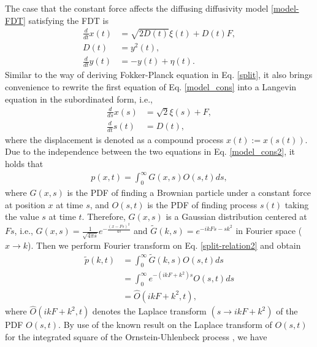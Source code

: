 \documentclass[aps,pre,twocolumn,groupedaddress,longbibliography]{revtex4-2}
\begin{document}
The case that the constant force affects the diffusing diffusivity model \eqref{model-FDT} satisfying the FDT is
\begin{equation}\label{model_cons}
\begin{split}
\frac{d}{d t}x(t)&=\sqrt{2D(t)}\xi(t)+D(t)F,\\
D(t)&=y^2(t),\\
\frac{d}{d t}y(t)&=-y(t)+\eta(t).
\end{split}
\end{equation}
Similar to the way of deriving Fokker-Planck equation in Eq. \eqref{split}, it also brings convenience to rewrite the first equation of Eq. \eqref{model_cons} into a Langevin equation in the subordinated form, i.e.,
\begin{equation}\label{model_cons2}
\begin{split}
\frac{d}{d s}x(s)&=\sqrt{2}\xi(s)+F,\\
\frac{d }{d t}s(t)&=D(t),
\end{split}
\end{equation}
where the displacement is denoted as a compound process $x(t):=x(s(t))$.
Due to the independence between the two equations in Eq. \eqref{model_cons2}, it holds that
\begin{equation}\label{split-relation2}
\begin{split}
p(x,t)=\int_0^\infty G(x,s)O(s,t)ds,
\end{split}
\end{equation}
where $G(x,s)$ is the PDF of finding a Brownian particle under a constant force at position $x$ at time $s$, and $O(s,t)$ is the PDF of finding process $s(t)$ taking the value $s$ at time $t$. Therefore, $G(x,s)$ is a Gaussian distribution centered at $Fs$, i.e., $G(x,s)=\frac{1}{\sqrt{4\pi s}}e^{-\frac{(x-Fs)^2}{4s}}$ and $\tilde{G}(k,s)=e^{-ikFs-s k^2}$ in Fourier space ($x\rightarrow k$). Then we perform Fourier transform on Eq. \eqref{split-relation2} and obtain
\begin{equation}\label{pkt2}
\begin{split}
\tilde{p}(k,t)&=\int_0^\infty \tilde{G}(k,s)O(s,t)ds\\
&=\int_0^\infty e^{-(ikF+k^2)s} O(s,t)ds\\
&=\hat{O}(ikF+k^2,t),
\end{split}
\end{equation}
where $\hat{O}(ikF+k^2,t)$ denotes the Laplace transform $(s\rightarrow ikF+k^2)$ of the PDF $O(s,t)$. By use of the known result on the Laplace transform of $O(s,t)$ for the integrated square of the Ornstein-Uhlenbeck process \cite{Dankel:1991,ChechkinSenoMetzlerSokolov:2017}, we have
\end{document}
